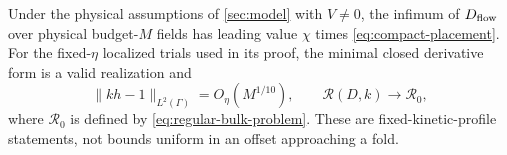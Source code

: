 \begin{corollary}
\label{cor:placement-bulk}
Under the physical assumptions of \cref{sec:model} with $V\ne0$,
the infimum of $D_{\mathrm{flow}}$ over physical budget-$M$ fields has leading
value $\chi$ times \eqref{eq:compact-placement}.
For the fixed-$\eta$ localized trials used in its proof, the minimal
closed derivative form is a valid realization and
\begin{equation}\label{eq:placement-bulk-remainder}
 \|kh-1\|_{L^2(\Gamma)}=O_\eta(M^{1/10}),\qquad
 \mathcal R(D,k)\longrightarrow\mathcal R_0,
\end{equation}
where $\mathcal R_0$ is defined by \eqref{eq:regular-bulk-problem}.
These are fixed-kinetic-profile statements, not bounds uniform in an
offset approaching a fold.
\end{corollary}
